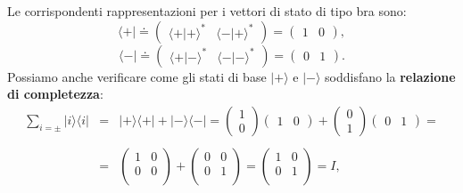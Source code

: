 \documentclass[a4paper,12pt,oneside]{book}
\begin{document}
Le corrispondenti rappresentazioni per i vettori di stato di tipo bra sono:
	\begin{equation}
		\langle + | \doteq
		\begin{pmatrix}
		\langle + | + \rangle ^* & \langle - | + \rangle ^* 
		\end{pmatrix} = 
		\begin{pmatrix}
		1 & 0
		\end{pmatrix} ,
		\end{equation}
		\begin{equation}
		\langle - |  \doteq
		\begin{pmatrix}
		\langle + | - \rangle ^* & \langle - | - \rangle ^* 
		\end{pmatrix} = 
		\begin{pmatrix}
		0 & 1
		\end{pmatrix} .
	\end{equation}
Possiamo anche verificare come gli stati di base $| + \rangle $ e $| - \rangle$ soddisfano la \textbf{relazione di completezza}:
	\begin{eqnarray}
		\sum \limits_{i=\pm} | i \rangle \langle i |  & = & | + \rangle \langle + |  + | - \rangle \langle - |  = 
		\begin{pmatrix}
		1 \\
		0
		\end{pmatrix}
		\begin{pmatrix}
		1 & 0
		\end{pmatrix} + 
		\begin{pmatrix}
		0 \\
		1
		\end{pmatrix}
		\begin{pmatrix}
		0 & 1
		\end{pmatrix}= \nonumber  \\
		\nonumber \\
		& = & \begin{pmatrix}
		1 & 0 \\
		0 & 0 \\
		\end{pmatrix}+
		\begin{pmatrix}
		0 & 0 \\
		0 & 1 \\
		\end{pmatrix}=
		\begin{pmatrix}
		1 & 0 \\
		0 & 1 \\
		\end{pmatrix}=  I  ,
	\end{eqnarray}
\end{document}
